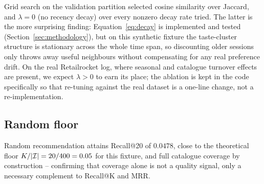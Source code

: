 Grid search on the validation partition selected cosine similarity over
Jaccard, and $\lambda = 0$ (no recency decay) over every nonzero decay rate
tried. The latter is the more surprising finding: Equation~\ref{eq:decay} is
implemented and tested (Section~\ref{sec:methodology}), but on this
synthetic fixture the taste-cluster structure is stationary across the whole
time span, so discounting older sessions only throws away useful neighbours
without compensating for any real preference drift. On the real Retailrocket
log, where seasonal and catalogue turnover effects are present, we expect
$\lambda > 0$ to earn its place; the ablation is kept in the code specifically
so that re-tuning against the real dataset is a one-line change, not a
re-implementation.

\subsection{Random floor}

Random recommendation attains Recall@20 of $0.0478$, close to the
theoretical floor $K / |\mathcal{I}| = 20/400 = 0.05$ for this fixture, and full
catalogue coverage by construction -- confirming that coverage alone is not a
quality signal, only a necessary complement to Recall@K and MRR.
